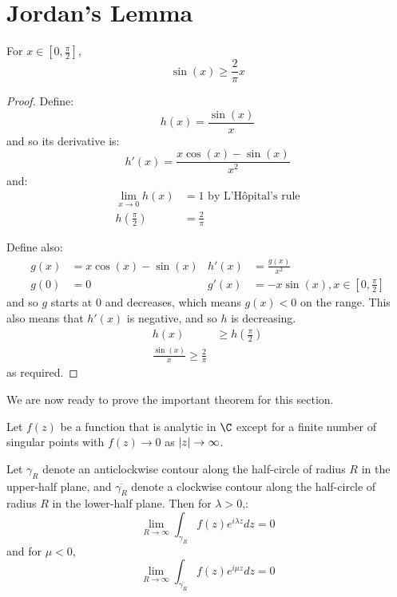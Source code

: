 \documentclass[../Main.tex]{subfiles}
\begin{document}
\section{Jordan's Lemma}
\begin{lemma}
    For $x \in \left[0, \frac\pi2\right]$,
    \begin{equation*}
        \sin(x) \geq \frac{2}{\pi} x
    \end{equation*}
    \label{lemSinIneq}
\end{lemma}
\begin{proof}
    Define:
    \begin{equation*}
        h(x) = \frac{\sin(x)}{x}
    \end{equation*}
    and so its derivative is:
    \begin{equation*}
        h'(x) = \frac{x\cos(x) - \sin(x)}{x^2}
    \end{equation*}
    and:
    \begin{align*}
        \lim_{x \to 0} h(x) &= 1 \text{ by L'H\^opital's rule}\\
        h\left(\frac{\pi}2\right) &= \frac{2}{\pi}
    \end{align*}

    Define also:
    \begin{align*}
        g(x) &= x\cos(x) - \sin(x) & h'(x) &= \frac{g(x)}{x^2} \\
        g(0) &= 0 & g'(x) &= -x\sin(x), x \in \left[0, \frac\pi2\right]
    \end{align*}
    and so $g$ starts at $0$ and decreases, which means $g(x) < 0$ on the range. This also means that $h'(x)$ is negative, and so $h$ is decreasing.
    \begin{align*}
        h(x) &\geq h\left(\frac\pi2\right) \\
        \frac{\sin(x)}{x} \geq \frac{2}{\pi}
    \end{align*}
    as required.
\end{proof}
We are now ready to prove the important theorem for this section.
\begin{theorem}
    Let $f(z)$ be a function that is analytic in $\C$ except for a finite number of singular points with $f(z) \to 0$ as $\left|z\right| \to \infty$.

    Let $\gamma_R$ denote an anticlockwise contour along the half-circle of radius $R$ in the upper-half plane, and $\overline{\gamma_R}$ denote a clockwise contour along the half-circle of radius $R$ in the lower-half plane. Then for $\lambda > 0$,:
    \begin{equation}
        \lim_{R \to \infty} \int_{\gamma_R} f(z) e^{i \lambda z} dz = 0
        \label{eqnJordanLemma}
    \end{equation}
    and for $\mu < 0$,
    \begin{equation}
        \lim_{R \to \infty} \int_{\overline{\gamma_R}} f(z) e^{i \mu z} dz = 0
        \label{eqnJordanLemma2}
    \end{equation}
    \label{thmJordanLemma}
\end{theorem}
\end{document}

